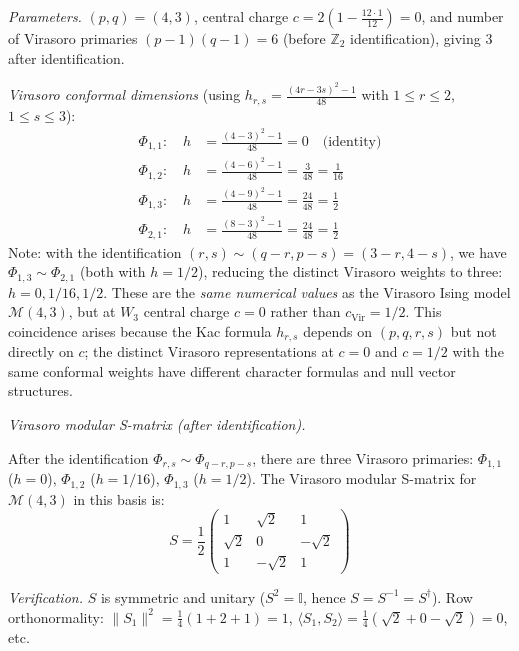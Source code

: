 \begin{example}\label{ex:w3-3-4-complete}

\emph{Parameters.}
$(p,q) = (4,3)$, central charge $c = 2(1 - \frac{12 \cdot 1}{12}) = 0$, and number of Virasoro primaries $(p-1)(q-1) = 6$ (before $\mathbb{Z}_2$ identification), giving 3 after identification.

\emph{Virasoro conformal dimensions} (using $h_{r,s} = \frac{(4r-3s)^2-1}{48}$ with $1 \leq r \leq 2$, $1 \leq s \leq 3$):
\begin{align}
\Phi_{1,1}: \quad h &= \frac{(4-3)^2 - 1}{48} = 0 \quad \text{(identity)} \\
\Phi_{1,2}: \quad h &= \frac{(4-6)^2 - 1}{48} = \frac{3}{48} = \frac{1}{16} \\
\Phi_{1,3}: \quad h &= \frac{(4-9)^2 - 1}{48} = \frac{24}{48} = \frac{1}{2} \\
\Phi_{2,1}: \quad h &= \frac{(8-3)^2 - 1}{48} = \frac{24}{48} = \frac{1}{2}
\end{align}
Note: with the identification $(r,s) \sim (q-r, p-s) = (3-r, 4-s)$, we have $\Phi_{1,3} \sim \Phi_{2,1}$ (both with $h = 1/2$), reducing the distinct Virasoro weights to three: $h = 0, 1/16, 1/2$. These are the \emph{same numerical values} as the Virasoro Ising model $\mathcal{M}(4,3)$, but at $W_3$ central charge $c = 0$ rather than $c_{\text{Vir}} = 1/2$. This coincidence arises because the Kac formula $h_{r,s}$ depends on $(p,q,r,s)$ but not directly on $c$; the distinct Virasoro representations at $c = 0$ and $c = 1/2$ with the same conformal weights have different character formulas and null vector structures.

\emph{Virasoro modular S-matrix (after identification).}

After the identification $\Phi_{r,s} \sim \Phi_{q-r,p-s}$, there are three Virasoro primaries: $\Phi_{1,1}$ ($h=0$), $\Phi_{1,2}$ ($h=1/16$), $\Phi_{1,3}$ ($h=1/2$). The Virasoro modular S-matrix for $\mathcal{M}(4,3)$ in this basis is:
\begin{equation}
S = \frac{1}{2}\begin{pmatrix}
1 & \sqrt{2} & 1 \\
\sqrt{2} & 0 & -\sqrt{2} \\
1 & -\sqrt{2} & 1
\end{pmatrix}
\end{equation}

\emph{Verification.} $S$ is symmetric and unitary ($S^2 = \mathbb{I}$, hence $S = S^{-1} = S^\dagger$). Row orthonormality: $\|S_1\|^2 = \frac{1}{4}(1+2+1)=1$, $\langle S_1, S_2\rangle = \frac{1}{4}(\sqrt{2}+0-\sqrt{2})=0$, etc.
\end{example}

